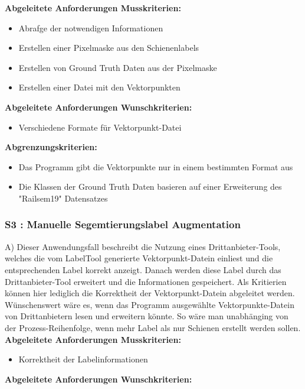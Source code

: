 \documentclass[11pt]{scrartcl}
\begin{document}
\noindent
\textbf{Abgeleitete Anforderungen Musskriterien:}

\begin{itemize}
	\item Abrafge der notwendigen Informationen
	\item Erstellen einer Pixelmaske aus den Schienenlabels
	\item Erstellen von Ground Truth Daten aus der Pixelmaske
	\item Erstellen einer Datei mit den Vektorpunkten
\end{itemize}
\textbf{Abgeleitete Anforderungen Wunschkriterien:}

\begin{itemize}
	\item Verschiedene Formate für Vektorpunkt-Datei
\end{itemize}
\textbf{Abgrenzungskriterien:}

\begin{itemize}
	\item Das Programm gibt die Vektorpunkte nur in einem bestimmten Format aus
	\item Die Klassen der Ground Truth Daten basieren auf einer Erweiterung des "Railsem19" Datensatzes
\end{itemize}

\subsubsection{S3 : Manuelle Segemtierungslabel Augmentation} 
\label{sec:S2 : Segmentationslabel Generierung}
A)
\noindent
Dieser Anwendungsfall beschreibt die Nutzung eines Drittanbieter-Tools, welches die vom LabelTool generierte Vektorpunkt-Datein einliest und die entsprechenden Label korrekt anzeigt. Danach werden diese Label durch das Drittanbieter-Tool erweitert und die Informationen gespeichert. Als Kritierien können hier lediglich die Korrektheit der Vektorpunkt-Datein abgeleitet werden. Wünschenswert wäre es, wenn das Programm ausgewählte Vektorpunkte-Datein von Drittanbietern lesen und erweitern könnte. So wäre man unabhänging von der Prozess-Reihenfolge, wenn mehr Label als nur Schienen erstellt werden sollen.
\\

\noindent
\textbf{Abgeleitete Anforderungen Musskriterien:}

\begin{itemize}
	\item Korrektheit der Labelinformationen
\end{itemize}
\textbf{Abgeleitete Anforderungen Wunschkriterien:}
\end{document}
